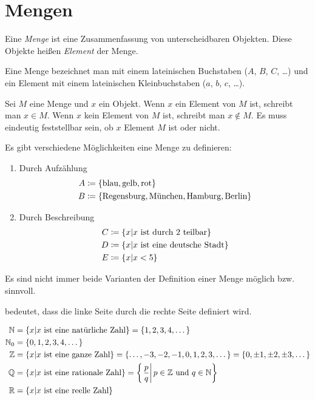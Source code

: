 \chapter{Mengen}
\begin{definition}[Menge]
Eine \emph{Menge} ist eine Zusammenfassung von unterscheidbaren Objekten. Diese Objekte heißen \emph{Element} der Menge.
\end{definition}

Eine Menge bezeichnet man mit einem lateinischen Buchstaben ($A$, $B$, $C$, \dots) und ein Element mit einem lateinischen Kleinbuchstaben ($a$, $b$, $c$, \dots).

Sei $M$ eine Menge und $x$ ein Objekt. Wenn $x$ ein Element von $M$ ist, schreibt man $x \in M$. Wenn $x$ kein Element von $M$ ist, schreibt man $x \notin M$. Es muss eindeutig feststellbar sein, ob $x$ Element $M$ ist oder nicht.

Es gibt verschiedene Möglichkeiten eine Menge zu definieren:
\begin{enumerate}
\item Durch Aufzählung
	\begin{align*}
	A &\mathrel{\mathop:\!\!=} \left\{\text{blau}, \text{gelb}, \text{rot}\right\}\\
	B &\mathrel{\mathop:\!\!=} \left\{\text{Regensburg}, \text{München}, \text{Hamburg}, \text{Berlin}\right\}
	\end{align*}
\item Durch Beschreibung
	\begin{align*}
	C &\mathrel{\mathop:\!\!=} \left\{x \vert x \text{ ist durch $2$ teilbar}\right\}\\
	D &\mathrel{\mathop:\!\!=} \left\{x \vert x \text{ ist eine deutsche Stadt}\right\}\\
	E &\mathrel{\mathop:\!\!=} \left\{x \vert x < 5\right\}
	\end{align*}
\end{enumerate}
\begin{note}
Es sind nicht immer beide Varianten der Definition einer Menge möglich \ac{bzw.} sinnvoll.
\end{note}

\begin{note}
\enq{\ceq} bedeutet, dass die linke Seite durch die rechte Seite definiert wird.
\end{note}

\begin{example}
\begin{align*}
\mathbb{N} &= \left\{x \vert x \text{ ist eine natürliche Zahl}\right\} = \left\{1, 2, 3, 4, \dots\right\}\\
\mathbb{N}_0 &= \left\{0, 1, 2, 3, 4, \dots\right\}\\
\mathbb{Z} &= \left\{x \vert x \text{ ist eine ganze Zahl}\right\} = \left\{\dots, -3, -2, -1, 0, 1, 2, 3, \dots\right\} = \left\{0, \pm 1, \pm 2, \pm 3, \dots\right\}\\
\mathbb{Q} &= \left\{x \vert x \text{ ist eine rationale Zahl}\right\} = \left\{\left.\frac{p}{q} \right| p \in \mathbb{Z} \text{ und } q \in \mathbb{N}\right\}\\
\mathbb{R} &= \left\{x \vert x \text{ ist eine reelle Zahl}\right\}
\end{align*}
\end{example}

